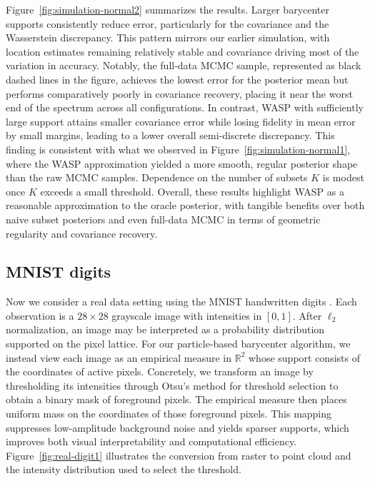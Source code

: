 \documentclass[11pt]{article}
\begin{document}
Figure~\ref{fig:simulation-normal2} summarizes the results. Larger barycenter supports consistently reduce error, particularly for the covariance and the Wasserstein discrepancy. This pattern mirrors our earlier simulation, with location estimates remaining relatively stable and covariance driving most of the variation in accuracy. Notably, the full-data MCMC sample, represented as black dashed lines in the figure, achieves the lowest error for the posterior mean but performs comparatively poorly in covariance recovery, placing it near the worst end of the spectrum across all configurations. In contrast, WASP with sufficiently large support attains smaller covariance error while losing fidelity in mean error by small margins, leading to a lower overall semi-discrete discrepancy. This finding is consistent with what we observed in Figure~\ref{fig:simulation-normal1}, where the WASP approximation yielded a more smooth, regular posterior shape than the raw MCMC samples. Dependence on the number of subsets $K$ is modest once $K$ exceeds a small threshold. Overall, these results highlight WASP as a reasonable approximation to the oracle posterior, with tangible benefits over both naive subset posteriors and even full-data MCMC in terms of geometric regularity and covariance recovery. 





\subsection{MNIST digits}

Now we consider a real data setting using the MNIST handwritten digits \citep{lecun_1998_MNISTDatabaseHandwritten}. Each observation is a $28\times 28$ grayscale image with intensities in $[0,1]$. After $\ell_2$ normalization, an image may be interpreted as a probability distribution supported on the pixel lattice. For our particle-based barycenter algorithm, we instead view each image as an empirical measure in $\mathbb{R}^2$ whose support consists of the coordinates of active pixels. Concretely, we transform an image by thresholding its intensities through Otsu's method \citep{otsu_1979_ThresholdSelectionMethod} for threshold selection to obtain a binary mask of foreground pixels. The empirical measure then places uniform mass on the coordinates of those foreground pixels. This mapping suppresses low-amplitude background noise and yields sparser supports, which improves both visual interpretability and computational efficiency. Figure~\ref{fig:real-digit1} illustrates the conversion from raster to point cloud and the intensity distribution used to select the threshold. 
\end{document}
